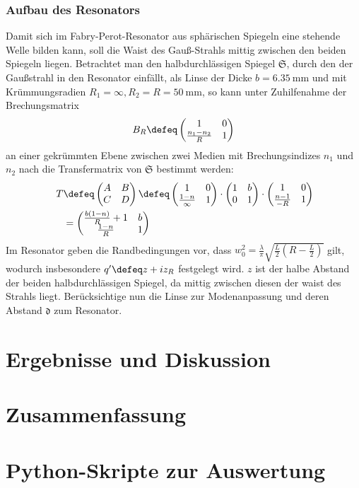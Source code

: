 \documentclass[11pt,a4paper,oneside]{scrartcl}
\begin{document}
\subsubsection{Aufbau des Resonators}
Damit sich im Fabry-Perot-Resonator aus sphärischen Spiegeln eine stehende Welle bilden kann, soll die Waist des Gauß-Strahls mittig zwischen den beiden Spiegeln liegen. Betrachtet man den halbdurchlässigen Spiegel $\mathfrak{S}$, durch den der Gaußstrahl in den Resonator einfällt, als Linse der Dicke $b=6.35\ \mathrm{mm}$ und mit Krümmungsradien $R_1=\infty,R_2=R=50\ \mathrm{mm}$, so kann unter Zuhilfenahme der Brechungsmatrix 
\begin{align}
B_R\defeq \begin{pmatrix}
1 & 0\\
\frac{n_1-n_2}{R} &1 
\end{pmatrix} 
\end{align}
an einer gekrümmten Ebene zwischen zwei Medien mit Brechungsindizes $n_1$ und $n_2$
nach \cite[Gl. 9.42c]{demtröder_2} die Transfermatrix von $\mathfrak{S}$ bestimmt werden:
\begin{align}
T & \defeq
\begin{pmatrix}
A & B\\
C & D 
\end{pmatrix} \defeq \begin{pmatrix}
1 & 0\\
\frac{1-n}{\infty} &1 
\end{pmatrix} 
\cdot
\begin{pmatrix}
1 & b\\
0 & 1
\end{pmatrix} 
\cdot
\begin{pmatrix}
1 & 0\\
\frac{n-1}{-R} &1 
\end{pmatrix} 
\\ \quad& = \begin{pmatrix}
\frac{b(1-n)}{R}+1 & b\\
\frac{1-n}{R} & 1
\end{pmatrix}
\end{align}
Im Resonator geben die Randbedingungen vor, dass $w_0^2=\frac{\lambda}{\pi}\sqrt{\frac{L}{2}\left(R-\frac{L}{2}\right)}$ gilt, wodurch insbesondere $q^\prime\defeq z+iz_R$ festgelegt wird. $z$ ist der halbe Abstand der beiden halbdurchlässigen Spiegel, da mittig zwischen diesen der waist des Strahls liegt. Berücksichtige nun die Linse zur Modenanpassung und deren Abstand $\mathfrak{d}$ zum Resonator.
\section{Ergebnisse und Diskussion}
\section{Zusammenfassung}
\newpage

 

\appendix

\section{Python-Skripte zur Auswertung}
\end{document}
